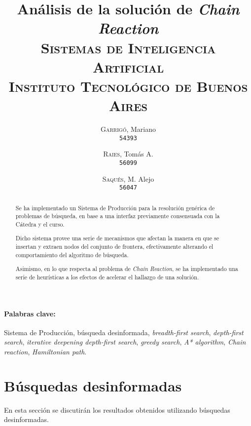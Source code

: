 \documentclass[12pt, twocolumn]{article}
\begin{document}
	\title{Análisis de la solución de \textit{Chain Reaction} \\ 
		   \large{\textsc{Sistemas de Inteligencia Artificial}} \\
		   \normalsize{\textsc{Instituto Tecnológico de Buenos Aires}}}
	\author{
		\textsc{Garrigó}, Mariano \\
		\texttt{54393}
		\and
		\textsc{Raies}, Tomás A. \\
		\texttt{56099}
		\and
		\textsc{Saqués}, M. Alejo \\
		\texttt{56047} 
	}
	\date{}
	\maketitle
	
	\begin{abstract}
		Se ha implementado un Sistema de Producción para la resolución genérica de problemas de búsqueda, en base a una interfaz previamente consensuada con la Cátedra y el curso.
		
		Dicho sistema provee una serie de mecanismos que afectan la manera en que se insertan y extraen nodos del conjunto de frontera, efectivamente alterando el comportamiento del algoritmo de búsqueda. 
		
		Asimismo, en lo que respecta al problema de \textit{Chain Reaction}, se ha implementado una serie de heurísticas a los efectos de acelerar el hallazgo de una solución. 
		 
	\end{abstract}
	
	\paragraph{Palabras clave:} Sistema de Producción, búsqueda desinformada, \textit{breadth-first search}, \textit{depth-first search}, \textit{iterative deepening depth-first search}, \textit{greedy search}, \textit{A* algorithm}, \textit{Chain reaction}, \textit{Hamiltonian path}.
	
	\section{Búsquedas desinformadas}
	
	\paragraph{} En esta sección se discutirán los resultados obtenidos utilizando búsquedas desinformadas.
	
\end{document}

